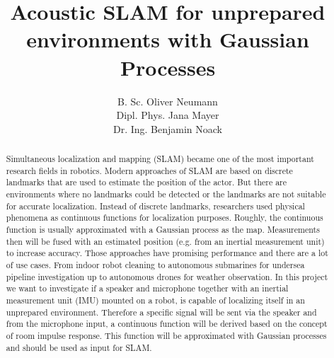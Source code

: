 \documentclass[runningheads]{llncs}
\begin{document}
%
\title{Acoustic SLAM for unprepared environments with Gaussian Processes}
%
%
\author{B. Sc. Oliver Neumann \\
Dipl. Phys. Jana Mayer \\
Dr. Ing. Benjamin Noack}

%
\maketitle              %
%

\begin{abstract}

Simultaneous localization and mapping (SLAM) became one of the most important research fields in robotics. Modern approaches of SLAM are based on discrete landmarks that are used to estimate the position of the actor. But there are environments where no landmarks could be detected or the landmarks are not suitable for accurate localization.
Instead of discrete landmarks, researchers used physical phenomena as continuous functions for localization purposes. Roughly, the continuous function is usually approximated with a Gaussian process as the map. Measurements then will be fused with an estimated position (e.g. from an inertial measurement unit) to increase accuracy.
Those approaches have promising performance and there are a lot of use cases. From indoor robot cleaning to autonomous submarines for undersea pipeline investigation up to autonomous drones for weather observation.
In this project we want to investigate if a speaker and microphone together with an inertial measurement unit (IMU)  mounted on a robot, is capable of localizing itself in an unprepared environment. Therefore a specific signal will be sent via the speaker and from the microphone input, a continuous function will be derived based on the concept of room impulse response.  This function will be approximated with Gaussian processes and should be used as input for SLAM.

\end{abstract}







\nocite{*}


{}


\end{document}
